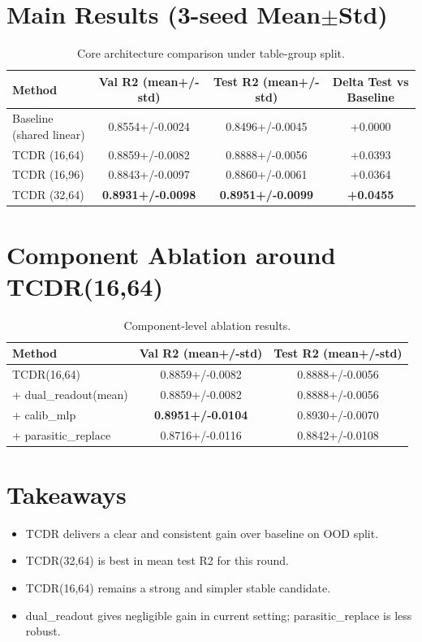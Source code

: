 \documentclass[11pt,a4paper]{article}
\begin{document}
\section{Main Results (3-seed Mean$\pm$Std)}
\begin{table}[htbp]
\centering
\small
\begin{tabular}{lccc}
\toprule
Method & Val R2 (mean+/-std) & Test R2 (mean+/-std) & Delta Test vs Baseline \\
\midrule
Baseline (shared linear) & 0.8554+/-0.0024 & 0.8496+/-0.0045 & +0.0000 \\
TCDR (16,64) & 0.8859+/-0.0082 & 0.8888+/-0.0056 & +0.0393 \\
TCDR (16,96) & 0.8843+/-0.0097 & 0.8860+/-0.0061 & +0.0364 \\
TCDR (32,64) & \textbf{0.8931+/-0.0098} & \textbf{0.8951+/-0.0099} & \textbf{+0.0455} \\
\bottomrule
\end{tabular}
\caption{Core architecture comparison under table-group split.}
\end{table}

\section{Component Ablation around TCDR(16,64)}
\begin{table}[htbp]
\centering
\small
\begin{tabular}{lcc}
\toprule
Method & Val R2 (mean+/-std) & Test R2 (mean+/-std) \\
\midrule
TCDR(16,64) & 0.8859+/-0.0082 & 0.8888+/-0.0056 \\
+ dual\_readout(mean) & 0.8859+/-0.0082 & 0.8888+/-0.0056 \\
+ calib\_mlp & \textbf{0.8951+/-0.0104} & 0.8930+/-0.0070 \\
+ parasitic\_replace & 0.8716+/-0.0116 & 0.8842+/-0.0108 \\
\bottomrule
\end{tabular}
\caption{Component-level ablation results.}
\end{table}

\section{Takeaways}
\begin{itemize}
  \item TCDR delivers a clear and consistent gain over baseline on OOD split.
  \item TCDR(32,64) is best in mean test R2 for this round.
  \item TCDR(16,64) remains a strong and simpler stable candidate.
  \item dual\_readout gives negligible gain in current setting; parasitic\_replace is less robust.
\end{itemize}
\end{document}
